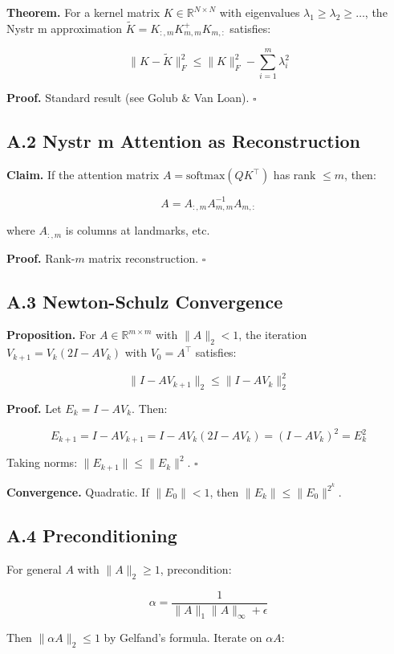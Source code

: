 \textbf{Theorem.} For a kernel matrix $K \in \mathbb{R}^{N \times N}$ with 
eigenvalues $\lambda_1 \geq \lambda_2 \geq \dots$, the Nystr m 
approximation $\tilde{K} = K_{:, m} K_{m, m}^+ K_{m, :}$ satisfies:

\[
\|K - \tilde{K}\|_F^2 \leq \|K\|_F^2 - \sum_{i=1}^{m} \lambda_i^2
\tag{A.1}
\]

\textbf{Proof.} Standard result (see Golub \& Van Loan). $\square$

\subsection{A.2 Nystr m Attention as Reconstruction}

\textbf{Claim.} If the attention matrix $A = \text{softmax}(Q K^\top)$ has rank $\leq m$, 
then:

\[
A = A_{:, m} A_{m, m}^{-1} A_{m, :}
\tag{A.2}
\]

where $A_{:, m}$ is columns at landmarks, etc.

\textbf{Proof.} Rank-$m$ matrix reconstruction. $\square$

\subsection{A.3 Newton-Schulz Convergence}

\textbf{Proposition.} For $A \in \mathbb{R}^{m \times m}$ with $\|A\|_2 < 1$, 
the iteration $V_{k+1} = V_k (2I - A V_k)$ with $V_0 = A^\top$ satisfies:

\[
\|I - A V_{k+1}\|_2 \leq \|I - A V_k\|_2^2
\tag{A.3}
\]

\textbf{Proof.} Let $E_k = I - A V_k$. Then:

\[
E_{k+1} = I - A V_{k+1} = I - A V_k (2I - A V_k) = (I - A V_k)^2 = E_k^2
\tag{A.4}
\]

Taking norms: $\|E_{k+1}\| \leq \|E_k\|^2$. $\square$

\textbf{Convergence.} Quadratic. If $\|E_0\| < 1$, then $\|E_k\| \leq \|E_0\|^{2^k}$.

\subsection{A.4 Preconditioning}

For general $A$ with $\|A\|_2 \geq 1$, precondition:

\[
\alpha = \frac{1}{\|A\|_1 \|A\|_\infty + \epsilon}
\tag{A.5}
\]

Then $\|\alpha A\|_2 \leq 1$ by Gelfand's formula. Iterate on $\alpha A$:

